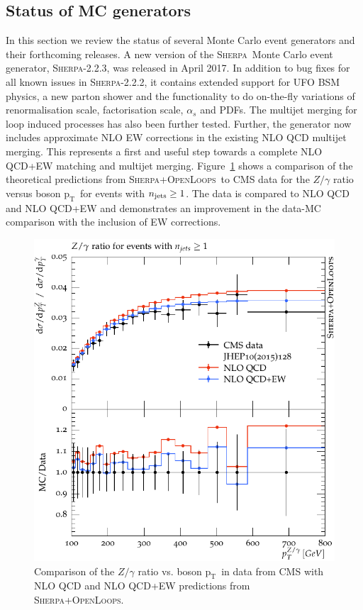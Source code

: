 \documentclass[a4paper,11pt,notoc]{article}
\newcommand{\pt}{\ensuremath{\mathrm{p_T}}}
\newcommand{\SHERPA}{\textsc{Sherpa}}
\newcommand{\OPENLOOPS}{\textsc{OpenLoops}}
\begin{document}
\subsection{Status of MC generators}
In this section we review the status of several Monte Carlo event generators and their forthcoming releases. 
A new version of the \SHERPA\ Monte Carlo event generator, \SHERPA-2.2.3, was released in April 2017. In addition to bug fixes for all known issues in \SHERPA-2.2.2, it contains extended support for UFO BSM physics, a new parton shower and the functionality to do on-the-fly variations of renormalisation scale, factorisation scale, $\alpha_s$ and PDFs. 
The multijet merging for loop induced processes has also been further tested. Further, the generator now includes approximate NLO EW corrections in the existing NLO QCD multijet merging. This represents a first and useful step towards a complete NLO QCD+EW matching and multijet merging. 
Figure~\ref{fig:ZGratio-sherpa} shows a comparison of the theoretical predictions from \SHERPA+\OPENLOOPS\ to CMS data for the $Z/\gamma$ ratio versus boson \pt\ for events with $n_{\rm jets} \ge 1$. The data is compared to NLO QCD and NLO QCD+EW and demonstrates an improvement in the data-MC comparison with the inclusion of EW corrections. 



\begin{figure}[t!]
\centering
\includegraphics[width=0.495\columnwidth]{Zgammaratio.pdf} 
\caption{Comparison of the $Z/\gamma$ ratio vs. boson \pt\ in data from CMS with NLO QCD and NLO QCD+EW predictions from \SHERPA+\OPENLOOPS.}
\label{fig:ZGratio-sherpa}
\end{figure}   
\end{document}
